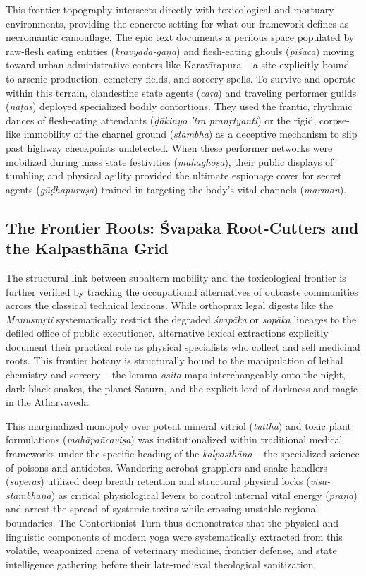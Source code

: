 \documentclass[11pt,twoside,letterpaper]{article}
\begin{document}
This frontier topography intersects directly with toxicological and mortuary environments, providing the concrete setting for what our framework defines as necromantic camouflage. The epic text documents a perilous space populated by raw-flesh eating entities (\textit{kravyāda-gaṇa}) and flesh-eating ghouls (\textit{piśāca}) moving toward urban administrative centers like Karavīrapura – a site explicitly bound to arsenic production, cemetery fields, and sorcery spells. To survive and operate within this terrain, clandestine state agents (\textit{cara}) and traveling performer guilds (\textit{naṭas}) deployed specialized bodily contortions. They used the frantic, rhythmic dances of flesh-eating attendants (\textit{ḍākinyo ’tra pranṛtyanti}) or the rigid, corpse-like immobility of the charnel ground (\textit{stambha}) as a deceptive mechanism to slip past highway checkpoints undetected. When these performer networks were mobilized during mass state festivities (\textit{mahāghoṣa}), their public displays of tumbling and physical agility provided the ultimate espionage cover for secret agents (\textit{gūḍhapuruṣa}) trained in targeting the body’s vital channels (\textit{marman}).

\subsection{The Frontier Roots: Śvapāka Root-Cutters and the Kalpasthāna Grid}
The structural link between subaltern mobility and the toxicological frontier is further verified by tracking the occupational alternatives of outcaste communities across the classical technical lexicons. While orthoprax legal digests like the \textit{Manusmṛti} systematically restrict the degraded \textit{śvapāka} or \textit{sopāka} lineages to the defiled office of public executioner, alternative lexical extractions explicitly document their practical role as physical specialists who collect and sell medicinal roots. This frontier botany is structurally bound to the manipulation of lethal chemistry and sorcery – the lemma \textit{asita} maps interchangeably onto the night, dark black snakes, the planet Saturn, and the explicit lord of darkness and magic in the Atharvaveda.

This marginalized monopoly over potent mineral vitriol (\textit{tuttha}) and toxic plant formulations (\textit{mahāpañcaviṣa}) was institutionalized within traditional medical frameworks under the specific heading of the \textit{kalpasthāna} – the specialized science of poisons and antidotes. Wandering acrobat-grapplers and snake-handlers (\textit{saperas}) utilized deep breath retention and structural physical locks (\textit{viṣa-stambhana}) as critical physiological levers to control internal vital energy (\textit{prāṇa}) and arrest the spread of systemic toxins while crossing unstable regional boundaries. The Contortionist Turn thus demonstrates that the physical and linguistic components of modern yoga were systematically extracted from this volatile, weaponized arena of veterinary medicine, frontier defense, and state intelligence gathering before their late-medieval theological sanitization.
\end{document}

